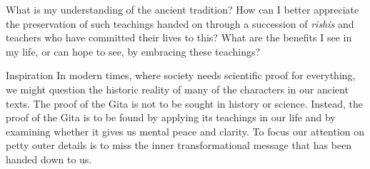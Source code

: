



\newpage
\begin{mananam}{} 
\mananamtext What is my understanding of the ancient tradition? How can I better appreciate the preservation of such teachings handed on through a succession of \emph{rishis} and teachers who have committed their lives to this? What are the benefits I see in my life, or can hope to see, by embracing these teachings? 
\end{mananam}
\WritingHand{}
\begin{inspiration}{\mananamfont Inspiration}
\mananamtext In modern times, where society needs scientific proof for everything, we might question the historic reality of many of the characters in our ancient texts. The proof of the Gita is not to be sought in history or science. Instead, the proof of the Gita is to be found by applying its teachings in our life and by examining whether it gives us mental peace and clarity. To focus our attention on petty outer details is to miss the inner transformational message that has been handed down to us.
\end{inspiration}
\newpage

